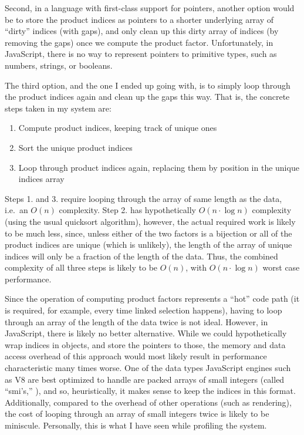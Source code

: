 \documentclass[
]{book}
\providecommand{\tightlist}{%
  \setlength{\itemsep}{0pt}\setlength{\parskip}{0pt}}
\theoremstyle{definition}
\theoremstyle{definition}
\theoremstyle{definition}
\theoremstyle{definition}
\theoremstyle{remark}
\begin{document}
Second, in a language with first-class support for pointers, another option would be to store the product indices as pointers to a shorter underlying array of ``dirty'' indices (with gaps), and only clean up this dirty array of indices (by removing the gaps) once we compute the product factor. Unfortunately, in JavaScript, there is no way to represent pointers to primitive types, such as numbers, strings, or booleans.

The third option, and the one I ended up going with, is to simply loop through the product indices again and clean up the gaps this way. That is, the concrete steps taken in my system are:

\begin{enumerate}
\def\labelenumi{\arabic{enumi}.}
\tightlist
\item
  Compute product indices, keeping track of unique ones
\item
  Sort the unique product indices
\item
  Loop through product indices again, replacing them by position in the unique indices array
\end{enumerate}

Steps 1. and 3. require looping through the array of same length as the data, i.e.~an \(O(n)\) complexity. Step 2. has hypothetically \(O(n \cdot \log n)\) complexity (using the usual quicksort algorithm), however, the actual required work is likely to be much less, since, unless either of the two factors is a bijection or all of the product indices are unique (which is unlikely), the length of the array of unique indices will only be a fraction of the length of the data. Thus, the combined complexity of all three steps is likely to be \(O(n)\), with \(O(n \cdot \log n)\) worst case performance.

Since the operation of computing product factors represents a ``hot'' code path (it is required, for example, every time linked selection happens), having to loop through an array of the length of the data twice is not ideal. However, in JavaScript, there is likely no better alternative. While we could hypothetically wrap indices in objects, and store the pointers to those, the memory and data access overhead of this approach would most likely result in performance characteristic many times worse. One of the data types JavaScript engines such as V8 are best optimized to handle are packed arrays of small integers (called ``smi's,'' ), and so, heuristically, it makes sense to keep the indices in this format. Additionally, compared to the overhead of other operations (such as rendering), the cost of looping through an array of small integers twice is likely to be miniscule. Personally, this is what I have seen while profiling the system.
\end{document}
